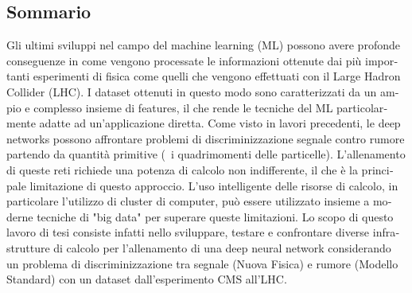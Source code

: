 \begin{otherlanguage}{italian}
 \chapter*{Sommario}
 Gli ultimi sviluppi nel campo del machine learning (ML) possono avere profonde
 conseguenze in come vengono processate le informazioni ottenute dai più importanti
 esperimenti di fisica come quelli che vengono effettuati con il Large Hadron Collider
 (LHC). I dataset ottenuti in questo modo sono caratterizzati da un ampio e complesso
 insieme di features, il che rende le tecniche del ML particolarmente adatte ad
 un'applicazione diretta. Come visto in lavori precedenti, le deep networks possono
 affrontare problemi di discriminizzazione segnale contro rumore partendo da quantità
 primitive (\eg~i quadrimomenti delle particelle). L'allenamento di queste reti richiede
 una potenza di calcolo non indifferente, il che è la principale limitazione di questo
 approccio. L'uso intelligente delle risorse di calcolo, in particolare l'utilizzo di
 cluster di computer, può essere utilizzato insieme a moderne tecniche di "big data" per
 superare queste limitazioni. Lo scopo di questo lavoro di tesi consiste infatti
 nello sviluppare, testare e confrontare diverse infrastrutture di calcolo per
 l'allenamento di una deep neural network considerando un problema di discriminizzazione
 tra segnale (Nuova Fisica) e rumore (Modello Standard) con un dataset dall'esperimento
 CMS all'LHC.
 
\end{otherlanguage}

\endgroup

\vfill
